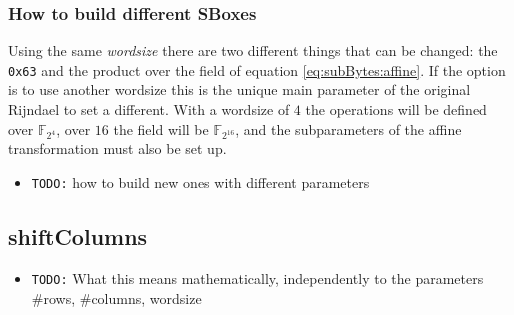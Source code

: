 \documentclass[10pt,a4paper,twoside]{llncs}
\newcommand{\Fpn}[2]{\ensuremath{\mathbb{F}_{#1^#2}}}
\begin{document}
\subsubsection{How to build different SBoxes}\label{sec:sbox}

Using the same \emph{wordsize} there are two different things that can be changed: the \texttt{0x63} and the product over the field of equation \ref{eq:subBytes:affine}. If the option is to use another wordsize this is the unique main parameter of the original Rijndael to set a different. With a wordsize of $4$ the operations will be defined over \Fpn{2}{4}, over $16$ the field will be \Fpn{2}{{16}}, and the subparameters of the affine transformation must also be set up.

\begin{itemize}
 \item \texttt{TODO:} how to build new ones with different parameters
\end{itemize}


\subsection{shiftColumns}\label{sec:shiftColumns}
\begin{itemize}
 \item \texttt{TODO:} What this means mathematically, independently to the parameters \#rows, \#columns, wordsize
\end{itemize}
\end{document}
